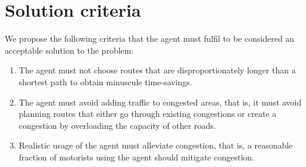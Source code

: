 \section{Solution criteria}
We propose the following criteria that the agent must fulfil to be considered an acceptable solution to the problem:

\begin{enumerate}
\item The agent must not choose routes that are disproportionately longer than a shortest path to obtain minuscule time-savings.\label{crit:distance}
\item The agent must avoid adding traffic to congested areas, that is, it must avoid planning routes that either go through existing congestions or create a congestion by overloading the capacity of other roads. \label{crit:overload}
\item Realistic usage of the agent must alleviate congestion, that is, a reasonable fraction of motorists using the agent should mitigate congestion.\label{crit:congestion}
\end{enumerate}


